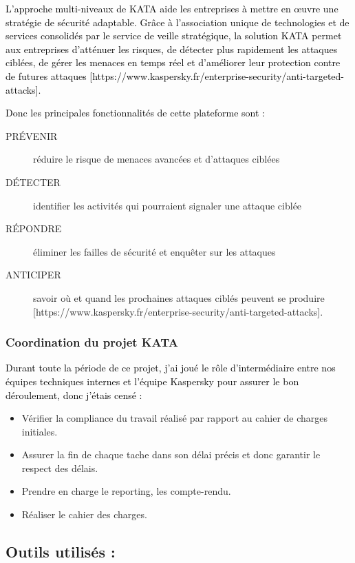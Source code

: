 \documentclass[a4paper,12pt]{report}
\begin{document}
\textcolor{black}{L’approche multi-niveaux de KATA aide les entreprises à mettre en œuvre une stratégie de sécurité adaptable. Grâce à l'association unique de technologies et de services consolidés par le service de veille stratégique, la solution KATA permet aux entreprises d’atténuer les risques, de détecter plus rapidement les attaques ciblées, de gérer les menaces en temps réel et d’améliorer leur protection contre de futures attaques [https://www.kaspersky.fr/enterprise-security/anti-targeted-attacks].}

\textcolor{black}{Donc les principales fonctionnalités de cette plateforme sont :}
\begin{description}
	\item [PRÉVENIR ] réduire le risque de menaces avancées et d'attaques ciblées 
	\item [DÉTECTER] identifier les activités qui pourraient signaler une attaque ciblée
	\item [RÉPONDRE] éliminer les failles de sécurité et enquêter sur les attaques 
	\item [ANTICIPER] savoir où et quand les prochaines attaques ciblés peuvent se produire
	[https://www.kaspersky.fr/enterprise-security/anti-targeted-attacks].
\end{description}

\subsubsection{Coordination du projet KATA}
\textcolor{black}{Durant toute la période de ce projet, j’ai joué le rôle d’intermédiaire entre nos équipes techniques internes et l’équipe Kaspersky pour assurer le bon déroulement, donc j’étais censé : }
\begin{itemize}
	\item Vérifier la compliance du travail réalisé par rapport au cahier de charges initiales.
	\item Assurer la fin de chaque tache dans son délai précis et donc garantir le respect des délais.
	\item Prendre en charge le reporting, les compte-rendu.
	\item Réaliser le cahier des charges.
\end{itemize}

\subsection*{\textbf{Outils utilisés :}}
\end{document}
